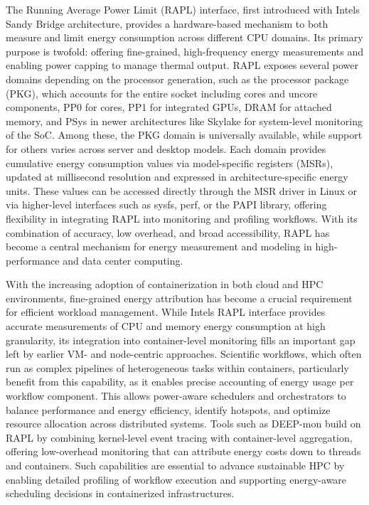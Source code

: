 The Running Average Power Limit (RAPL) interface, first introduced with Intels Sandy Bridge architecture, provides a hardware-based mechanism to both measure and limit energy consumption across different CPU domains. Its primary purpose is twofold: offering fine-grained, high-frequency energy measurements and enabling power capping to manage thermal output. RAPL exposes several power domains depending on the processor generation, such as the processor package (PKG), which accounts for the entire socket including cores and uncore components, PP0 for cores, PP1 for integrated GPUs, DRAM for attached memory, and PSys in newer architectures like Skylake for system-level monitoring of the SoC. Among these, the PKG domain is universally available, while support for others varies across server and desktop models. Each domain provides cumulative energy consumption values via model-specific registers (MSRs), updated at millisecond resolution and expressed in architecture-specific energy units. These values can be accessed directly through the MSR driver in Linux or via higher-level interfaces such as sysfs, perf, or the PAPI library, offering flexibility in integrating RAPL into monitoring and profiling workflows. With its combination of accuracy, low overhead, and broad accessibility, RAPL has become a central mechanism for energy measurement and modeling in high-performance and data center computing.

With the increasing adoption of containerization in both cloud and HPC environments, fine-grained energy attribution has become a crucial requirement for efficient workload management. While Intels RAPL interface provides accurate measurements of CPU and memory energy consumption at high granularity, its integration into container-level monitoring fills an important gap left by earlier VM- and node-centric approaches. Scientific workflows, which often run as complex pipelines of heterogeneous tasks within containers, particularly benefit from this capability, as it enables precise accounting of energy usage per workflow component. This allows power-aware schedulers and orchestrators to balance performance and energy efficiency, identify hotspots, and optimize resource allocation across distributed systems. Tools such as DEEP-mon build on RAPL by combining kernel-level event tracing with container-level aggregation, offering low-overhead monitoring that can attribute energy costs down to threads and containers. Such capabilities are essential to advance sustainable HPC by enabling detailed profiling of workflow execution and supporting energy-aware scheduling decisions in containerized infrastructures.


